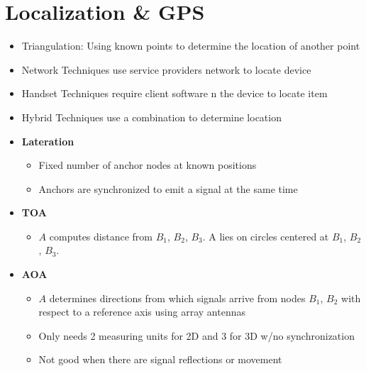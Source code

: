 \documentclass{article}
\begin{document}
    \section{Localization \& GPS}
    \begin{itemize}
        \item Triangulation: Using known points to determine the location of another point
        \item Network Techniques use service providers network to locate device
        \item Handset Techniques require client software n the device to locate item
        \item Hybrid Techniques use a combination to determine location
        \item \textbf{Lateration}
        \begin{itemize}
            \item Fixed number of anchor nodes at known positions
            \item Anchors are synchronized to emit a signal at the same time
        \end{itemize}
        \item \textbf{TOA}
        \begin{itemize}
            \item $A$ computes distance from $B_1$, $B_2$, $B_3$. A lies on circles centered at $B_1$, $B_2$, $B_3$.
        \end{itemize}
        \item \textbf{AOA}
        \begin{itemize}
            \item $A$ determines directions from which signals arrive from nodes $B_1$, $B_2$ with respect to a reference axis using array antennas
            \item Only needs 2 measuring units for 2D and 3 for 3D w/no synchronization
            \item Not good when there are signal reflections or movement
        \end{itemize}
    \end{itemize}
\end{document}
